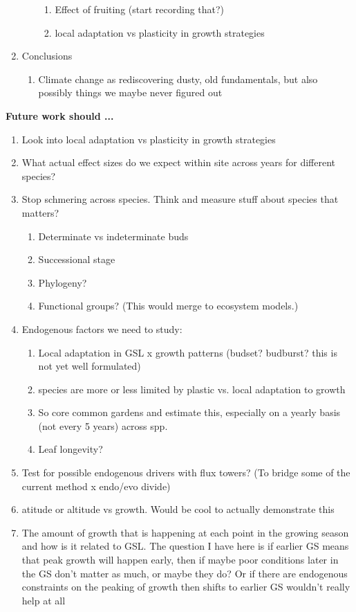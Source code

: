 \documentclass[11pt,letter]{article}
\begin{document}
\begin{enumerate}
\begin{enumerate}
\begin{enumerate}
\item Effect of fruiting (start recording that?)
\item local adaptation vs plasticity in growth strategies 
\end{enumerate}
\end{enumerate}
\item Conclusions
\begin{enumerate}
\item Climate change as rediscovering dusty, old fundamentals, but also possibly things we maybe never figured out
\end{enumerate}
\end{enumerate}

{\bf Future work should ...}
\begin{enumerate}
\item Look into local adaptation vs plasticity in growth strategies
\item What actual effect sizes do we expect within site across years for different species?
\item Stop schmering across species. Think and measure stuff about species that matters?
\begin{enumerate}
\item Determinate vs indeterminate buds
\item Successional stage
\item Phylogeny? 
\item Functional groups? (This would merge to ecosystem models.)
\end{enumerate}
\item Endogenous factors we need to study: 
\begin{enumerate}
\item Local adaptation in GSL x growth patterns (budset? budburst? this is not yet well formulated)
\item species are more or less limited by plastic vs. local adaptation to growth
\item So core common gardens and estimate this, especially on a yearly basis (not every 5 years) across spp. 
\item Leaf longevity?
\end{enumerate}
\item Test for possible endogenous drivers with flux towers? (To bridge some of the current method x endo/evo divide)
\item atitude or altitude vs growth. Would be cool to actually demonstrate this
\item The amount of growth that is happening at each point in the growing season and how is it related to GSL. The question I have here is if earlier GS means that peak growth will happen early, then if maybe poor conditions later in the GS don’t matter as much, or maybe they do? Or if there are endogenous constraints on the peaking of growth then shifts to earlier GS wouldn’t really help at all

\end{enumerate}
\end{document}
